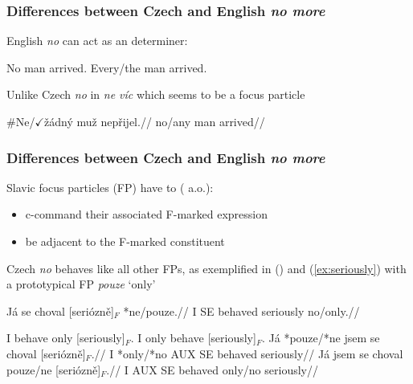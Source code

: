 \documentclass[10pt
]{beamer}
\begin{document}
\begin{frame}
  \frametitle{Differences between Czech and English \textit{no more}}

English \textit{no} can act as an determiner:

\pex \a No man arrived.
\a Every/the man arrived.
\xe

Unlike Czech \textit{no} in \textit{ne víc} which seems to be a focus particle

\ex \begingl
\gla \#Ne/$\checkmark$žádný muž nepřijel.//
\glb no/any man arrived//
\endgl
\xe

\end{frame}

\begin{frame}
  \frametitle{Differences between Czech and English \textit{no more}}

  Slavic focus particles (FP) have to (\cite{jasinskaja_information_2012} a.o.):
  
  \begin{itemize}
    \item c-command their associated F-marked expression
    \item be adjacent to the F-marked constituent
   
  \end{itemize}

\end{frame}

\begin{frame}

  Czech \textit{no} behaves like all other FPs, as exemplified in (\nextx) and (\ref{ex:seriously}) with a prototypical FP \emph{pouze} `only'
    

  \ex 
  \begingl
  \gla Já se choval {[}seriózně{]}\(_F\) *ne/pouze.//
  \glb I SE behaved seriously no/only.//
  \endgl
  \xe

  \pex\label{ex:seriously} \a I behave only {[}seriously{]}\(_F\). 
  \a I only behave {[}seriously{]}\(_F\). 
  \a
  \begingl
  \gla Já *pouze/*ne jsem se choval {[}seriózně{]}\(_F\).//
  \glb I *only/*no AUX SE behaved seriously//
  \endgl
  \a
  \begingl 
  \gla  Já jsem se choval pouze/ne {[}seriózně{]}\(_F\).//
  \glb I AUX SE behaved only/no seriously//
  \endgl
  \xe

\end{frame}
\end{document}
